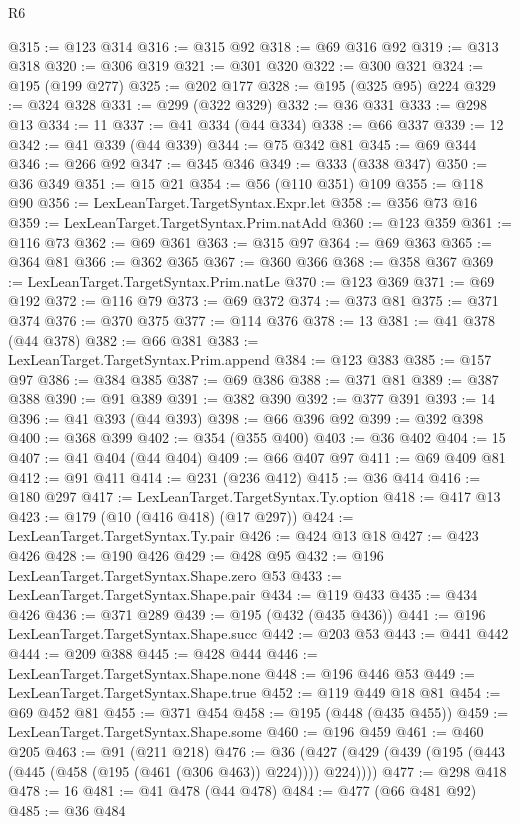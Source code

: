 \begin{lexlean}{R6}
\begin{coremodule}
@315 := @123 @314
@316 := @315 @92
@318 := @69 @316 @92
@319 := @313 @318
@320 := @306 @319
@321 := @301 @320
@322 := @300 @321
@324 := @195 (@199 @277)
@325 := @202 @177
@328 := @195 (@325 @95) @224
@329 := @324 @328
@331 := @299 (@322 @329)
@332 := @36 @331
@333 := @298 @13
@334 := 11
@337 := @41 @334 (@44 @334)
@338 := @66 @337
@339 := 12
@342 := @41 @339 (@44 @339)
@344 := @75 @342 @81
@345 := @69 @344
@346 := @266 @92
@347 := @345 @346
@349 := @333 (@338 @347)
@350 := @36 @349
@351 := @15 @21
@354 := @56 (@110 @351) @109
@355 := @118 @90
@356 := LexLeanTarget.TargetSyntax.Expr.let
@358 := @356 @73 @16
@359 := LexLeanTarget.TargetSyntax.Prim.natAdd
@360 := @123 @359
@361 := @116 @73
@362 := @69 @361
@363 := @315 @97
@364 := @69 @363
@365 := @364 @81
@366 := @362 @365
@367 := @360 @366
@368 := @358 @367
@369 := LexLeanTarget.TargetSyntax.Prim.natLe
@370 := @123 @369
@371 := @69 @192
@372 := @116 @79
@373 := @69 @372
@374 := @373 @81
@375 := @371 @374
@376 := @370 @375
@377 := @114 @376
@378 := 13
@381 := @41 @378 (@44 @378)
@382 := @66 @381
@383 := LexLeanTarget.TargetSyntax.Prim.append
@384 := @123 @383
@385 := @157 @97
@386 := @384 @385
@387 := @69 @386
@388 := @371 @81
@389 := @387 @388
@390 := @91 @389
@391 := @382 @390
@392 := @377 @391
@393 := 14
@396 := @41 @393 (@44 @393)
@398 := @66 @396 @92
@399 := @392 @398
@400 := @368 @399
@402 := @354 (@355 @400)
@403 := @36 @402
@404 := 15
@407 := @41 @404 (@44 @404)
@409 := @66 @407 @97
@411 := @69 @409 @81
@412 := @91 @411
@414 := @231 (@236 @412)
@415 := @36 @414
@416 := @180 @297
@417 := LexLeanTarget.TargetSyntax.Ty.option
@418 := @417 @13
@423 := @179 (@10 (@416 @418) (@17 @297))
@424 := LexLeanTarget.TargetSyntax.Ty.pair
@426 := @424 @13 @18
@427 := @423 @426
@428 := @190 @426
@429 := @428 @95
@432 := @196 LexLeanTarget.TargetSyntax.Shape.zero @53
@433 := LexLeanTarget.TargetSyntax.Shape.pair
@434 := @119 @433
@435 := @434 @426
@436 := @371 @289
@439 := @195 (@432 (@435 @436))
@441 := @196 LexLeanTarget.TargetSyntax.Shape.succ
@442 := @203 @53
@443 := @441 @442
@444 := @209 @388
@445 := @428 @444
@446 := LexLeanTarget.TargetSyntax.Shape.none
@448 := @196 @446 @53
@449 := LexLeanTarget.TargetSyntax.Shape.true
@452 := @119 @449 @18 @81
@454 := @69 @452 @81
@455 := @371 @454
@458 := @195 (@448 (@435 @455))
@459 := LexLeanTarget.TargetSyntax.Shape.some
@460 := @196 @459
@461 := @460 @205
@463 := @91 (@211 @218)
@476 := @36 (@427 (@429 (@439 (@195 (@443 (@445 (@458 (@195 (@461 (@306 @463)) @224)))) @224))))
@477 := @298 @418
@478 := 16
@481 := @41 @478 (@44 @478)
@484 := @477 (@66 @481 @92)
@485 := @36 @484

\end{coremodule}
\end{lexlean}
